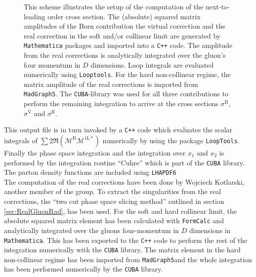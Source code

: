 \begin{figure}[H]
\begin{center}
\caption{This scheme illustrates the setup of the computation of the next-to-leading order cross section. The (absolute) squared matrix amplitudes of the Born contribution the virtual correction and the real correction in the soft and/or collinear limit are generated by \texttt{Mathematica} packages and imported into a \texttt{C++} code. The amplitude from the real corrections is analytically integrated over the gluon's four momentum in $D$ dimensions. Loop integrals are evaluated numerically using \texttt{Looptools}. For the hard non-collinear regime, the matrix amplitude of the real corrections is imported from \texttt{MadGraph5}. The \texttt{CUBA}-library was used for all three contributions to perform the remaining integration to arrive at the cross sections $\sigma^{\mathrm{B}}$, $\sigma^{\mathrm{V}}$ and $\sigma^{\mathrm{R}}$.}\label{fig:CalcSetup}
\end{center}
\end{figure}
This output file is in turn invoked by a \texttt{C++} code which evaluates the scalar integrals of $ \sum 2\Re (\mathcal{M}^{\mathrm{B}} \mathcal{M}^{\mathrm{1L}\ast})$ numerically by using the package \texttt{LoopTools}. Finally the phase space integration and the integration over $x_1$ and $x_2$ is performed by the integration routine ``Cuhre'' which is part of the \texttt{CUBA} library\cite{Hahn:2004fe}. The parton density functions are included using \texttt{LHAPDF6}\cite{Buckley:2014ana}\\
The computation of the real corrections have been done by Wojciech Kotlarski, another member of the group. To extract the singularities from the real corrections, the ``two cut phase space slicing method'' outlined in section \ref{sec:RealGluonRad}, has been used. For the soft and hard collinear limit, the absolute squared matrix element has been calculated with \texttt{FormCalc} and analytically integrated over the gluons four-momentum in $D$ dimensions in \texttt{Mathematica}. This has been exported to the \texttt{C++} code to perform the rest of the integration numerically with the \texttt{CUBA} library. The matrix element in the hard non-collinear regime has been imported from \texttt{MadGraph5}\cite{Alwall:2014hca}and the whole integration has been performed numerically by the \texttt{CUBA} library.\\
